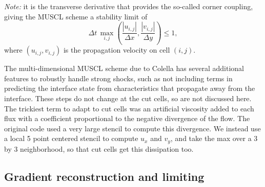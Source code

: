 \textit{Note:} it is the transverse derivative that provides the so-called corner coupling,
giving the MUSCL scheme a stability limit of
\begin{equation}
\label{eqn:bigcfllimit}
\Delta t \, \max_{i,j} \left (\frac{|u_{i,j}|}{\Delta x} , \frac{|v_{i,j}|}{\Delta y} \right) \leq 1,
\end{equation}
where $(u_{i,j}, v_{i,j})$ is the propagation velocity on cell $(i,j)$.



The multi-dimensional MUSCL scheme due to Colella has several additional
features to robustly handle strong shocks, such as not including terms in
predicting the interface state from characteristics that propagate 
away from the interface. These
steps do not change at the cut cells, so are not discussed here.  The
trickiest term to adapt to cut cells was an artificial viscosity 
added to each flux with a
coefficient proportional to the negative divergence of the flow.  The original
code used a very large stencil to compute this divergence. We instead use a local 5
point centered stencil to compute $u_x$ and $v_y$, and take the max over a 3 by 3
neighborhood, so that cut cells get this dissipation too.



\subsection{Gradient reconstruction and limiting }\label{sec:limit}

